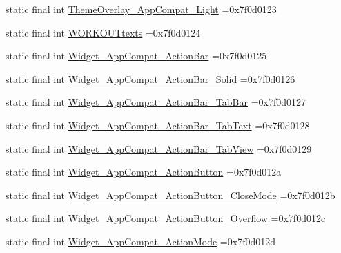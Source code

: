 \begin{DoxyCompactItemize}
\item 
static final int \mbox{\hyperlink{classcom_1_1example_1_1trainawearapplication_1_1_r_1_1style_a6337f9222f0ba5bb04f89f4eccdf04de}{Theme\+Overlay\+\_\+\+App\+Compat\+\_\+\+Light}} =0x7f0d0123
\item 
static final int \mbox{\hyperlink{classcom_1_1example_1_1trainawearapplication_1_1_r_1_1style_af878390e7226d16692159c0b5afe7ae3}{W\+O\+R\+K\+O\+U\+Ttexts}} =0x7f0d0124
\item 
static final int \mbox{\hyperlink{classcom_1_1example_1_1trainawearapplication_1_1_r_1_1style_a23828b46dd2a2cd3f1382ea8fbbe2aca}{Widget\+\_\+\+App\+Compat\+\_\+\+Action\+Bar}} =0x7f0d0125
\item 
static final int \mbox{\hyperlink{classcom_1_1example_1_1trainawearapplication_1_1_r_1_1style_a30f82e40492cee0cb4e0a7dcd6c917e7}{Widget\+\_\+\+App\+Compat\+\_\+\+Action\+Bar\+\_\+\+Solid}} =0x7f0d0126
\item 
static final int \mbox{\hyperlink{classcom_1_1example_1_1trainawearapplication_1_1_r_1_1style_af576a44fe9cd08c126abdfd87a602588}{Widget\+\_\+\+App\+Compat\+\_\+\+Action\+Bar\+\_\+\+Tab\+Bar}} =0x7f0d0127
\item 
static final int \mbox{\hyperlink{classcom_1_1example_1_1trainawearapplication_1_1_r_1_1style_a5452036f49d0859bb52aa0dfff4b5712}{Widget\+\_\+\+App\+Compat\+\_\+\+Action\+Bar\+\_\+\+Tab\+Text}} =0x7f0d0128
\item 
static final int \mbox{\hyperlink{classcom_1_1example_1_1trainawearapplication_1_1_r_1_1style_a6220925a9c54b77137a10db37f0fe9d6}{Widget\+\_\+\+App\+Compat\+\_\+\+Action\+Bar\+\_\+\+Tab\+View}} =0x7f0d0129
\item 
static final int \mbox{\hyperlink{classcom_1_1example_1_1trainawearapplication_1_1_r_1_1style_a346f7df1a06ad2120f876bc97dc891d3}{Widget\+\_\+\+App\+Compat\+\_\+\+Action\+Button}} =0x7f0d012a
\item 
static final int \mbox{\hyperlink{classcom_1_1example_1_1trainawearapplication_1_1_r_1_1style_aebaea2195a28b01a11adcb672819d368}{Widget\+\_\+\+App\+Compat\+\_\+\+Action\+Button\+\_\+\+Close\+Mode}} =0x7f0d012b
\item 
static final int \mbox{\hyperlink{classcom_1_1example_1_1trainawearapplication_1_1_r_1_1style_ac26edf9e9b19cd2f5661861f4632b5f0}{Widget\+\_\+\+App\+Compat\+\_\+\+Action\+Button\+\_\+\+Overflow}} =0x7f0d012c
\item 
static final int \mbox{\hyperlink{classcom_1_1example_1_1trainawearapplication_1_1_r_1_1style_aaf2e10a37ee0ee41f6144016ca92b181}{Widget\+\_\+\+App\+Compat\+\_\+\+Action\+Mode}} =0x7f0d012d

\end{DoxyCompactItemize}
